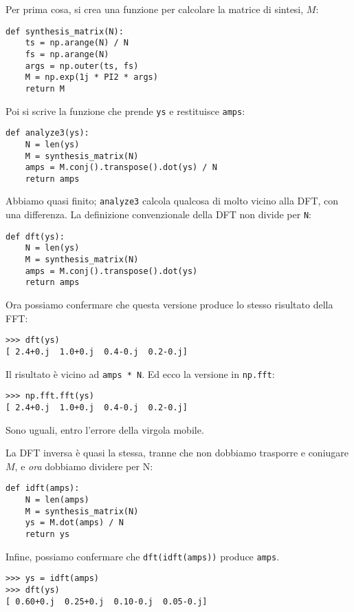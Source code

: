 \documentclass[12pt]{book} \usepackage[width=5.5in,height=8.5in, hmarginratio=3:2,vmarginratio=1:1]{geometry}
\begin{document}
Per prima cosa, si crea una funzione per calcolare la matrice di sintesi, $M$:

\begin{verbatim} 
def synthesis_matrix(N):
    ts = np.arange(N) / N
    fs = np.arange(N)
    args = np.outer(ts, fs)
    M = np.exp(1j * PI2 * args)
    return M
 \end{verbatim} 

Poi si scrive la funzione che prende {\tt ys} e restituisce {\tt amps}:

\begin{verbatim} 
def analyze3(ys):
    N = len(ys)
    M = synthesis_matrix(N)
    amps = M.conj().transpose().dot(ys) / N
    return amps
 \end{verbatim} 

Abbiamo quasi finito; {\tt analyze3} calcola qualcosa di molto vicino alla DFT, con una differenza. La definizione convenzionale della DFT non divide per {\tt N}:

\begin{verbatim} 
def dft(ys):
    N = len(ys)
    M = synthesis_matrix(N)
    amps = M.conj().transpose().dot(ys)
    return amps
 \end{verbatim} 

Ora possiamo confermare che questa versione produce lo stesso risultato della FFT:

\begin{verbatim} 
>>> dft(ys)
[ 2.4+0.j  1.0+0.j  0.4-0.j  0.2-0.j]
 \end{verbatim} 

Il risultato è vicino ad {\tt amps * N}. Ed ecco la versione in {\tt np.fft}:

\begin{verbatim} 
>>> np.fft.fft(ys)
[ 2.4+0.j  1.0+0.j  0.4-0.j  0.2-0.j]
 \end{verbatim} 

Sono uguali, entro l'errore della virgola mobile.

La DFT inversa è quasi la stessa, tranne che non dobbiamo trasporre e coniugare $M$, e {\em ora} dobbiamo dividere per N:

\begin{verbatim}
def idft(amps):
    N = len(amps)
    M = synthesis_matrix(N)
    ys = M.dot(amps) / N
    return ys
\end{verbatim} 

Infine, possiamo confermare che {\tt dft(idft(amps))} produce {\tt amps}.

\begin{verbatim} 
>>> ys = idft(amps)
>>> dft(ys)
[ 0.60+0.j  0.25+0.j  0.10-0.j  0.05-0.j]
 \end{verbatim} 
\end{document}
